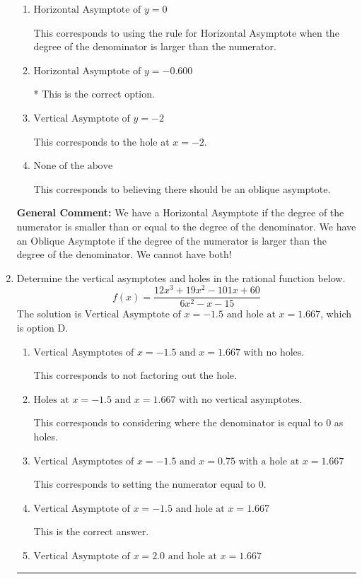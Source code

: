 \documentclass{extbook}[14pt]
\newcommand{\litem}[1]{\item #1

\rule{\textwidth}{0.4pt}}
\begin{document}
\begin{enumerate}
{\begin{enumerate}[label=\Alph*.]
This corresponds to the hole at $x = 0.800$.
\item \( \text{Horizontal Asymptote of } y = 0  \)

This corresponds to using the rule for Horizontal Asymptote when the degree of the denominator is larger than the numerator.
\item \( \text{Horizontal Asymptote of } y = -0.600  \)

* This is the correct option.
\item \( \text{Vertical Asymptote of } y = -2  \)

This corresponds to the hole at $x = -2$.
\item \( \text{None of the above} \)

This corresponds to believing there should be an oblique asymptote.
\end{enumerate}

\textbf{General Comment:} We have a Horizontal Asymptote if the degree of the numerator is smaller than or equal to the degree of the denominator. We have an Oblique Asymptote if the degree of the numerator is larger than the degree of the denominator. We cannot have both!
}
\litem{
Determine the vertical asymptotes and holes in the rational function below.
\[ f(x) = \frac{12x^{3} +19 x^{2} -101 x + 60}{6x^{2} -x -15} \]The solution is \( \text{Vertical Asymptote of } x = -1.5 \text{ and hole at } x = 1.667 \), which is option D.\begin{enumerate}[label=\Alph*.]
\item \( \text{Vertical Asymptotes of } x = -1.5 \text{ and } x = 1.667 \text{ with no holes.} \)

This corresponds to not factoring out the hole.
\item \( \text{Holes at } x = -1.5 \text{ and } x = 1.667 \text{ with no vertical asymptotes.} \)

This corresponds to considering where the denominator is equal to 0 as holes.
\item \( \text{Vertical Asymptotes of } x = -1.5 \text{ and } x = 0.75 \text{ with a hole at } x = 1.667 \)

This corresponds to setting the numerator equal to 0.
\item \( \text{Vertical Asymptote of } x = -1.5 \text{ and hole at } x = 1.667 \)

This is the correct answer.
\item \( \text{Vertical Asymptote of } x = 2.0 \text{ and hole at } x = 1.667 \)


\end{enumerate}}
\end{enumerate}
\end{document}
